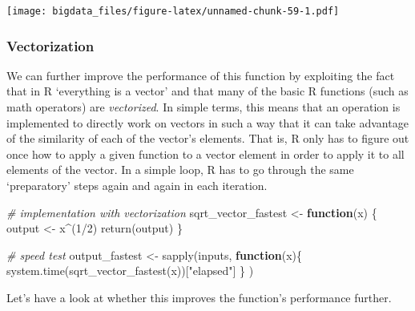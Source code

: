 \documentclass[
  12pt,
]{style/krantz}
\newenvironment{Shaded}{\begin{snugshade}}{\end{snugshade}}
\newcommand{\CommentTok}[1]{\textcolor[rgb]{0.56,0.35,0.01}{\textit{#1}}}
\newcommand{\ControlFlowTok}[1]{\textcolor[rgb]{0.13,0.29,0.53}{\textbf{#1}}}
\newcommand{\DecValTok}[1]{\textcolor[rgb]{0.00,0.00,0.81}{#1}}
\newcommand{\FunctionTok}[1]{\textcolor[rgb]{0.00,0.00,0.00}{#1}}
\newcommand{\NormalTok}[1]{#1}
\newcommand{\OtherTok}[1]{\textcolor[rgb]{0.56,0.35,0.01}{#1}}
\newcommand{\SpecialCharTok}[1]{\textcolor[rgb]{0.00,0.00,0.00}{#1}}
\newcommand{\StringTok}[1]{\textcolor[rgb]{0.31,0.60,0.02}{#1}}
\begin{document}
\texttt{[image: bigdata\_files/figure-latex/unnamed-chunk-59-1.pdf]}

\hypertarget{vectorization}{%
\subsubsection{Vectorization}\label{vectorization}}

We can further improve the performance of this function by exploiting the fact that in R `everything is a vector' and that many of the basic R functions (such as math operators) are \emph{vectorized}. In simple terms, this means that an operation is implemented to directly work on vectors in such a way that it can take advantage of the similarity of each of the vector's elements. That is, R only has to figure out once how to apply a given function to a vector element in order to apply it to all elements of the vector. In a simple loop, R has to go through the same `preparatory' steps again and again in each iteration.

\begin{Shaded}
\begin{Highlighting}[]
\CommentTok{\# implementation with vectorization}
\NormalTok{sqrt\_vector\_fastest }\OtherTok{\textless{}{-}} 
     \ControlFlowTok{function}\NormalTok{(x) \{}
\NormalTok{               output }\OtherTok{\textless{}{-}}\NormalTok{  x}\SpecialCharTok{\^{}}\NormalTok{(}\DecValTok{1}\SpecialCharTok{/}\DecValTok{2}\NormalTok{)}
          \FunctionTok{return}\NormalTok{(output)}
\NormalTok{     \}}

\CommentTok{\# speed test}
\NormalTok{output\_fastest }\OtherTok{\textless{}{-}} 
     \FunctionTok{sapply}\NormalTok{(inputs, }
            \ControlFlowTok{function}\NormalTok{(x)\{ }\FunctionTok{system.time}\NormalTok{(}\FunctionTok{sqrt\_vector\_fastest}\NormalTok{(x))[}\StringTok{"elapsed"}\NormalTok{]}
\NormalTok{                 \}}
\NormalTok{            )}
\end{Highlighting}
\end{Shaded}

Let's have a look at whether this improves the function's performance further.
\end{document}
